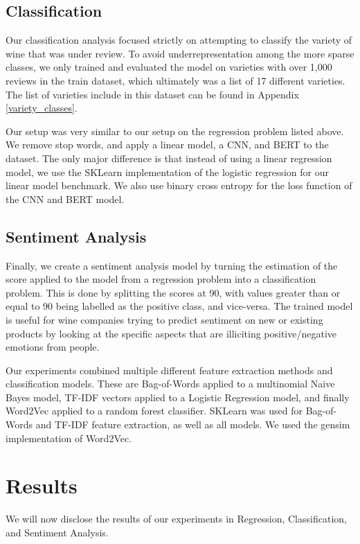 \documentclass[12pt]{IEEEtran}
\begin{document}
\subsection{Classification}
    Our classification analysis focused strictly on attempting to classify the variety of wine that was under review. To avoid underrepresentation among the more sparse classes, we only trained and evaluated the model on varieties with over 1,000 reviews in the train dataset, which ultimately was a list of 17 different varieties. The list of varieties include in this dataset can be found in Appendix \ref{variety_classes}. \par
    Our setup was very similar to our setup on the regression problem listed above. We remove stop words, and apply a linear model, a CNN, and BERT to the dataset. The only major difference is that instead of using a linear regression model, we use the SKLearn implementation of the logistic regression for our linear model benchmark\cite{sklearn}. We also use binary cross entropy for the loss function of the CNN and BERT model.

\subsection{Sentiment Analysis}
    Finally, we create a sentiment analysis model by turning the estimation of the score applied to the model from a regression problem into a classification problem. This is done by splitting the scores at 90, with values greater than or equal to 90 being labelled as the positive class, and vice-versa. The trained model is useful for wine companies trying to predict sentiment on new or existing products by looking at the specific aspects that are illiciting positive/negative emotions from people. \par
    Our experiments combined multiple different feature extraction methods and classification models. These are Bag-of-Words applied to a multinomial 
    Naive Bayes model, TF-IDF vectors applied to a Logistic Regression model, and finally Word2Vec applied to a random forest classifier. SKLearn was used for Bag-of-Words and TF-IDF feature extraction, as well as all models. We used the gensim implementation of Word2Vec\cite{gensim}. \par

\section{Results}
    We will now disclose the results of our experiments in Regression, Classification, and Sentiment Analysis.
\end{document}
